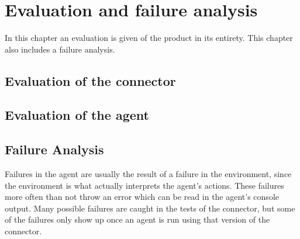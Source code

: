 \chapter{Evaluation and failure analysis}
In this chapter an evaluation is given of the product in its entirety. This chapter also includes a failure analysis. 

\section{Evaluation of the connector}

\section{Evaluation of the agent}

\section{Failure Analysis}
Failures in the agent are usually the result of a failure in the environment, since the environment is what actually interprets the agent's actions.
These failures more often than not throw an error which can be read in the agent's console output.
Many possible failures are caught in the tests of the connector, but some of the failures only show up once an agent is run using that version of the connector.
